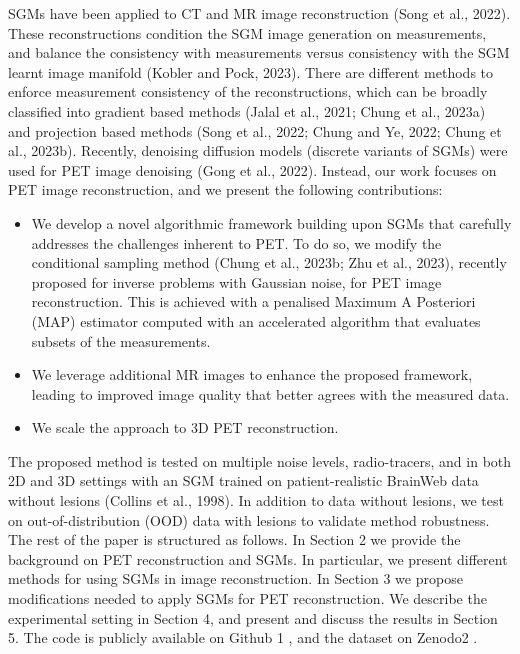 \documentclass{article}
\begin{document}
SGMs have been applied to CT and MR image reconstruction (Song et al., 2022). These reconstructions condition the SGM image generation on measurements, and balance the consistency with measurements versus consistency with the SGM learnt image manifold (Kobler and Pock, 2023). There are different methods to enforce measurement consistency of the reconstructions, which can be broadly classified into gradient based methods (Jalal et al., 2021; Chung et al., 2023a) and projection based methods (Song et al., 2022; Chung and Ye, 2022; Chung et al., 2023b). Recently, denoising diffusion models (discrete variants of SGMs) were used for PET image denoising (Gong et al., 2022). Instead, our work focuses on PET image reconstruction, and we present the following contributions:
\begin{itemize}
\item 
We develop a novel algorithmic framework building upon SGMs that carefully addresses the challenges inherent to PET. To do so, we modify the conditional sampling method (Chung et al., 2023b; Zhu et al., 2023), recently proposed for inverse problems with Gaussian noise, for PET image reconstruction. This is achieved with a penalised Maximum A Posteriori (MAP) estimator computed with an accelerated algorithm that evaluates subsets of the measurements.

\item 
We leverage additional MR images to enhance the proposed framework, leading to improved image quality that better agrees with the measured data.

\item 
We scale the approach to 3D PET reconstruction.

\end{itemize}

The proposed method is tested on multiple noise levels, radio-tracers, and in both 2D and 3D settings with an SGM trained on patient-realistic BrainWeb data without lesions (Collins et al., 1998). In addition to data without lesions, we test on out-of-distribution (OOD) data with lesions to validate method robustness. The rest of the paper is structured as follows. In Section 2 we provide the background on PET reconstruction and SGMs. In particular, we present different methods for using SGMs in image reconstruction. In Section 3 we propose modifications needed to apply SGMs for PET reconstruction. We describe the experimental setting in Section 4, and present and discuss the results in Section 5. The code is publicly available on Github 1 , and the dataset on Zenodo2 .
\end{document}
